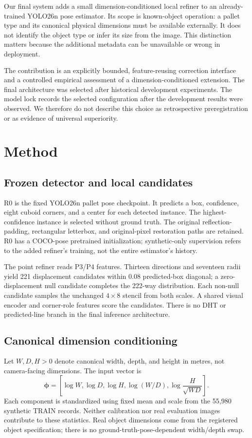 \documentclass[journal]{IEEEtran}
\begin{document}
Our final system adds a small dimension-conditioned local refiner to an already-trained YOLO26n pose estimator. Its scope is known-object operation: a pallet type and its canonical physical dimensions must be available externally. It does not identify the object type or infer its size from the image. This distinction matters because the additional metadata can be unavailable or wrong in deployment.

The contribution is an explicitly bounded, feature-reusing correction interface and a controlled empirical assessment of a dimension-conditioned extension. The final architecture was selected after historical development experiments. The model lock records the selected configuration after the development results were observed. We therefore do not describe this choice as retrospective preregistration or as evidence of universal superiority.

\section{Method}
\subsection{Frozen detector and local candidates}
R0 is the fixed YOLO26n pallet pose checkpoint. It predicts a box, confidence, eight cuboid corners, and a center for each detected instance. The highest-confidence instance is selected without ground truth. The original reflection-padding, rectangular letterbox, and original-pixel restoration paths are retained. R0 has a COCO-pose pretrained initialization; synthetic-only supervision refers to the added refiner's training, not the entire estimator's history.

The point refiner reads P3/P4 features. Thirteen directions and seventeen radii yield 221 displacement candidates within 0.08 predicted-box diagonal; a zero-displacement null candidate completes the 222-way distribution. Each non-null candidate samples the unchanged $4\times8$ stencil from both scales. A shared visual encoder and corner-role features score the candidates. There is no DHT or predicted-line branch in the final inference architecture.

\subsection{Canonical dimension conditioning}
Let $W,D,H>0$ denote canonical width, depth, and height in metres, not camera-facing dimensions. The input vector is
\begin{equation}
\boldsymbol\phi=\left[\log W,\log D,\log H,\log(W/D),\log\frac{H}{\sqrt{WD}}\right].
\end{equation}
Each component is standardized using fixed mean and scale from the 55,980 synthetic TRAIN records. Neither calibration nor real evaluation images contribute to these statistics. Real object dimensions come from the registered object specification; there is no ground-truth-pose-dependent width/depth swap.
\end{document}
